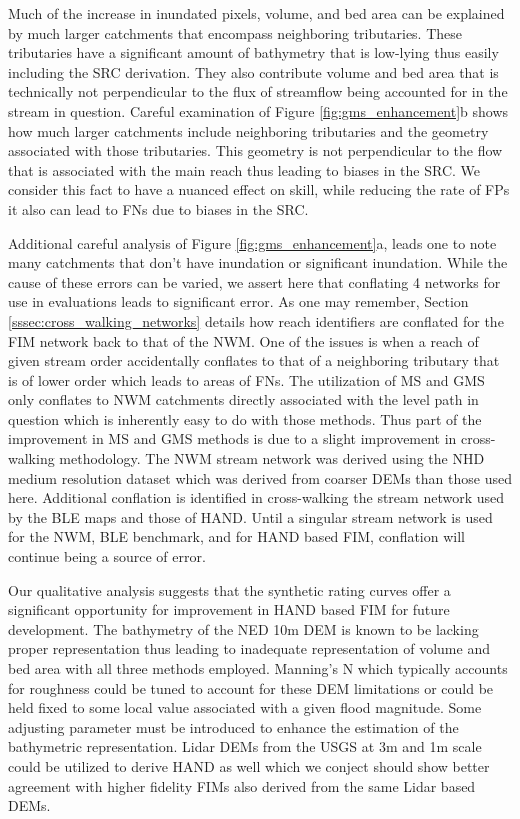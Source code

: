 Much of the increase in inundated pixels, volume, and bed area can be explained by much larger catchments that encompass neighboring tributaries.
These tributaries have a significant amount of bathymetry that is low-lying thus easily including the SRC derivation. 
They also contribute volume and bed area that is technically not perpendicular to the flux of streamflow being accounted for in the stream in question. 
Careful examination of Figure \ref{fig:gms_enhancement}b shows how much larger catchments include neighboring tributaries and the geometry associated with those tributaries. 
This geometry is not perpendicular to the flow that is associated with the main reach thus leading to biases in the SRC.
We consider this fact to have a nuanced effect on skill, while reducing the rate of FPs it also can lead to FNs due to biases in the SRC.

Additional careful analysis of Figure \ref{fig:gms_enhancement}a, leads one to note many catchments that don't have inundation or significant inundation.
While the cause of these errors can be varied, we assert here that conflating 4 networks for use in evaluations leads to significant error.
As one may remember, Section \ref{sssec:cross_walking_networks} details how reach identifiers are conflated for the FIM network back to that of the NWM. 
One of the issues is when a reach of given stream order accidentally conflates to that of a neighboring tributary that is of lower order which leads to areas of FNs.
The utilization of MS and GMS only conflates to NWM catchments directly associated with the level path in question which is inherently easy to do with those methods. 
Thus part of the improvement in MS and GMS methods is due to a slight improvement in cross-walking methodology.
The NWM stream network was derived using the NHD medium resolution dataset which was derived from coarser DEMs than those used here. 
Additional conflation is identified in cross-walking the stream network used by the BLE maps and those of HAND.
Until a singular stream network is used for the NWM, BLE benchmark, and for HAND based FIM, conflation will continue being a source of error.

Our qualitative analysis suggests that the synthetic rating curves offer a significant opportunity for improvement in HAND based FIM for future development.
The bathymetry of the NED 10m DEM is known to be lacking proper representation thus leading to inadequate representation of volume and bed area with all three methods employed.
Manning's N which typically accounts for roughness could be tuned to account for these DEM limitations or could be held fixed to some local value associated with a given flood magnitude.
Some adjusting parameter must be introduced to enhance the estimation of the bathymetric representation.
Lidar DEMs from the USGS at 3m and 1m scale could be utilized to derive HAND as well which we conject should show better agreement with higher fidelity FIMs also derived from the same Lidar based DEMs.

